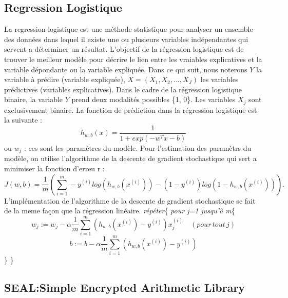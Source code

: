 \documentclass[a4paper,12pt]{article}
\begin{document}
\subsection{Regression Logistique}
La regression logistique est une méthode statistique pour analyser un ensemble des données dans lequel il existe une ou plusieurs variables indépendantes qui servent a déterminer un résultat.\newline
L'objectif de la régression logistique est de trouver le meilleur modèle pour décrire le lien entre les vraiables explicatives et la variable dépondante ou la variable expliquée.\newline
Dans ce qui suit, nous noterons $Y$ la variable à prédire (variable expliquée), $X = (X_1, X_2, ..., X_J)$ les variables prédictives (variables explicatives). \newline
Dans le cadre de la régression logistique binaire, la variable $Y$ prend deux modalités possibles \{1, 0\}. Les variables $X_j$ sont exclusivement binaire. \newline
La fonction de prédiction dans la régression logistique est la suivante :\newline
$$h_{w,b}(x)=\dfrac{1}{1 + exp(-w^T x - b)}$$
ou $w_j$ : ces sont les paramètres du modèle.\newline
Pour l'estimation des paramètrs du modèle, on utilise l'algorithme de la descente de gradient stochastique qui sert a minimiser la fonction d'erreu r :\newline
$$J(w,b) = \dfrac{1}{m}(\sum_{i=1}^{m}-y^{(i)}log(h_{w,b}(x^{(i)}))-(1-y^{(i)})log(1 - h_{w,b}(x^{(i)}))).$$\newline 
L'implémentation de l'algorithme de la descente de gradient stochastique se fait de la meme façon que la régression linéaire.\newline
\textit{répéter}\{\newline 
\hspace*{1cm}\textit{pour j=1 jusqu'à m}\{
$$w_j := w_j - \alpha  \dfrac{1}{m}\sum_{i = 1}^{m} (h_{w,b}(x^{(i)}) - y^{(i)})x_j^{(i)} \quad(pour\, tout \, j)$$
$$ b := b - \alpha  \dfrac{1}{m}\sum_{i = 1}^{m} (h_{w,b}(x^{(i)}) - y^{(i)})$$
\hspace*{1cm}\}\newline
\} 
\subsection{SEAL:Simple Encrypted Arithmetic Library}
\end{document}

